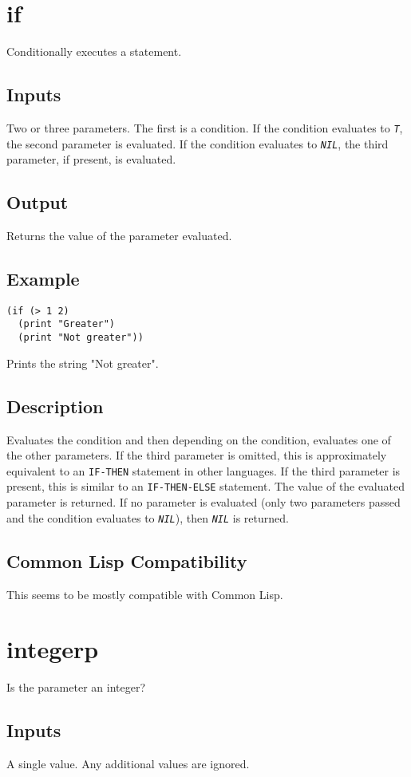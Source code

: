 \documentclass[10pt, openany]{book}
\newcommand{\constant}[1]{\emph{\texttt{#1}}}
\newcommand{\keyword}[1]{\texttt{#1}}
\newcommand{\cl}{Common Lisp}
\begin{document}
\section{if}
Conditionally executes a statement.
\subsection{Inputs}
Two or three parameters.  The first is a condition.  If the condition evaluates to \constant{T}, the second parameter is evaluated.  If the condition evaluates to \constant{NIL}, the third parameter, if present, is evaluated.
\subsection{Output}
Returns the value of the parameter evaluated.
\subsection{Example}
\begin{lstlisting}
(if (> 1 2)
  (print "Greater")
  (print "Not greater"))
\end{lstlisting}
Prints the string "Not greater".
\subsection{Description}
Evaluates the condition and then depending on the condition, evaluates one of the other parameters.  If the third parameter is omitted, this is approximately equivalent to an \keyword{IF-THEN} statement in other languages.  If the third parameter is present, this is similar to an \keyword{IF-THEN-ELSE} statement.  The value of the evaluated parameter is returned.  If no parameter is evaluated (only two parameters passed and the condition evaluates to \constant{NIL}), then \constant{NIL} is returned.
\subsection{Common Lisp Compatibility}
This seems to be mostly compatible with \cl.

\section{integerp}
Is the parameter an integer?
\subsection{Inputs}
A single value.  Any additional values are ignored.
\end{document}
